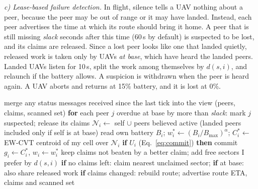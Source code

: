 \documentclass[conference]{IEEEtran}
\begin{document}
\emph{c) Lease-based failure detection.} In flight, silence tells a UAV nothing about a peer, because the peer may be out of range or it may have landed. Instead, each peer advertises the time at which its route should bring it home. A peer that is still missing \textit{slack} seconds after this time (60\,s by default) is suspected to be lost, and its claims are released. Since a lost peer looks like one that landed quietly, released work is taken only by UAVs \emph{at base}, which have heard the landed peers. Landed UAVs listen for 10\,s, split the work among themselves by $d(s,i)$, and relaunch if the battery allows. A suspicion is withdrawn when the peer is heard again. A UAV aborts and returns at 15\% battery, and it is lost at 0\%.

\begin{algorithm}[t]
\caption{Control tick of one UAV (every 5\,s).}\label{alg:tick}
\footnotesize
\begin{algorithmic}[1]
\STATE merge any status messages received since the last tick into the view (peers, claims, scanned set)
\STATE \textbf{for} each peer $j$ overdue at base by more than \textit{slack}: mark $j$ suspected; release its claims
\STATE $\mathcal N_i\leftarrow$ self $\cup$ peers believed active (landed peers included only if self is at base)
\STATE read own battery $B_i$; $w_i^*\leftarrow(B_i/B_{\max})^{\alpha}$; $C_i^*\leftarrow$ EW-CVT centroid of my cell over $\mathcal N_i$
\STATE \textbf{if} $U_i$ (Eq.~\ref{eq:commit}) \textbf{then} commit $g_i\leftarrow C_i^*$, $w_i\leftarrow w_i^*$
\STATE keep claims not beaten by a better claim; add free sectors I prefer by $d(s,i)$
\STATE \textbf{if} no claims left: claim nearest unclaimed sector; \textbf{if} at base: also share released work
\STATE \textbf{if} claims changed: rebuild route; advertise route ETA, claims and scanned set
\end{algorithmic}
\end{algorithm}

\begin{table}[!t]
\caption{Detection results on 150 held-out frames (AP in \%; precision and recall at confidence 0.25). Best in bold.}
\label{tab:perc}
\centering\footnotesize
\setlength{\tabcolsep}{4pt}

\end{table}
\end{document}
